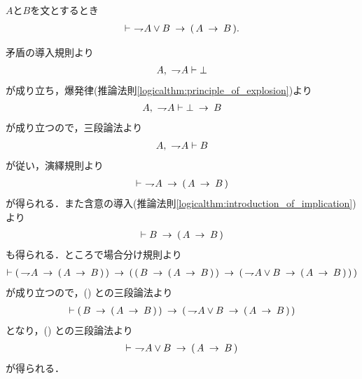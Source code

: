 	\begin{screen}
		\begin{logicalthm}[否定の論理和は含意で書ける]
		\label{logicalthm:disjunction_of_negation_rewritable_by_implication}
			$A$と$B$を文とするとき
			\begin{align}
				\vdash\ \negation A \vee B \rarrow (\, A \rarrow B\, ).
			\end{align}
		\end{logicalthm}
	\end{screen}
	
	\begin{prf}
		矛盾の導入規則より
		\begin{align}
			A,\ \negation A \vdash \bot
		\end{align}
		が成り立ち，爆発律(推論法則\ref{logicalthm:principle_of_explosion})より
		\begin{align}
			A,\ \negation A \vdash \bot \rarrow B
		\end{align}
		が成り立つので，三段論法より
		\begin{align}
			A,\ \negation A \vdash B
		\end{align}
		が従い，演繹規則より
		\begin{align}
			\vdash\ \negation A \rarrow (\, A \rarrow B\, )
			\label{fom:disjunction_of_negation_rewritable_by_implication_1}
		\end{align}
		が得られる．また含意の導入(推論法則\ref{logicalthm:introduction_of_implication})より
		\begin{align}
			\vdash B \rarrow (\, A \rarrow B\, )
			\label{fom:disjunction_of_negation_rewritable_by_implication_2}
		\end{align}
		も得られる．ところで場合分け規則より
		\begin{align}
			\vdash (\, \negation A \rarrow (\, A \rarrow B\, )\, )
			\rarrow (\, (\, B \rarrow (\, A \rarrow B\, )\, )
			\rarrow (\, \negation A \vee B \rarrow (\, A \rarrow B\, )\, )\, )
		\end{align}
		が成り立つので，()
		との三段論法より
		\begin{align}
			\vdash (\, B \rarrow (\, A \rarrow B\, )\, )
			\rarrow (\, \negation A \vee B \rarrow (\, A \rarrow B\, )\, )
		\end{align}
		となり，()
		との三段論法より
		\begin{align}
			\vdash\ \negation A \vee B \rarrow (\, A \rarrow B\, )
		\end{align}
		が得られる．
		\QED
	\end{prf}
	
